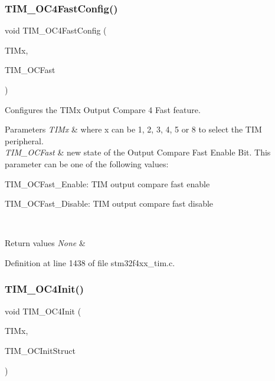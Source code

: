 \subsubsection{\texorpdfstring{T\+I\+M\+\_\+\+O\+C4\+Fast\+Config()}{TIM\_OC4FastConfig()}}
{\footnotesize\ttfamily void T\+I\+M\+\_\+\+O\+C4\+Fast\+Config (\begin{DoxyParamCaption}\item[{\hyperlink{struct_t_i_m___type_def}{T\+I\+M\+\_\+\+Type\+Def} $\ast$}]{T\+I\+Mx,  }\item[{uint16\+\_\+t}]{T\+I\+M\+\_\+\+O\+C\+Fast }\end{DoxyParamCaption})}



Configures the T\+I\+Mx Output Compare 4 Fast feature. 


\begin{DoxyParams}{Parameters}
{\em T\+I\+Mx} & where x can be 1, 2, 3, 4, 5 or 8 to select the T\+IM peripheral. \\
\hline
{\em T\+I\+M\+\_\+\+O\+C\+Fast} & new state of the Output Compare Fast Enable Bit. This parameter can be one of the following values\+: \begin{DoxyItemize}
\item T\+I\+M\+\_\+\+O\+C\+Fast\+\_\+\+Enable\+: T\+IM output compare fast enable \item T\+I\+M\+\_\+\+O\+C\+Fast\+\_\+\+Disable\+: T\+IM output compare fast disable \end{DoxyItemize}
\\
\hline
\end{DoxyParams}

\begin{DoxyRetVals}{Return values}
{\em None} & \\
\hline
\end{DoxyRetVals}


Definition at line 1438 of file stm32f4xx\+\_\+tim.\+c.

\mbox{\label{group___t_i_m___group2_ga64571ebbb58cac39a9e760050175f11c}} 
\subsubsection{\texorpdfstring{T\+I\+M\+\_\+\+O\+C4\+Init()}{TIM\_OC4Init()}}
{\footnotesize\ttfamily void T\+I\+M\+\_\+\+O\+C4\+Init (\begin{DoxyParamCaption}\item[{\hyperlink{struct_t_i_m___type_def}{T\+I\+M\+\_\+\+Type\+Def} $\ast$}]{T\+I\+Mx,  }\item[{\hyperlink{struct_t_i_m___o_c_init_type_def}{T\+I\+M\+\_\+\+O\+C\+Init\+Type\+Def} $\ast$}]{T\+I\+M\+\_\+\+O\+C\+Init\+Struct }\end{DoxyParamCaption})}



